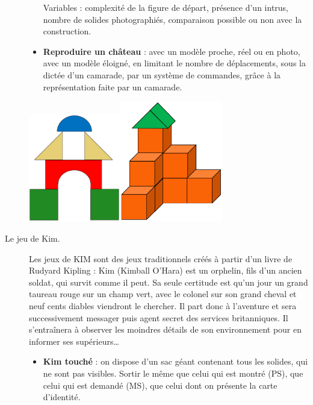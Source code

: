 \begin{exercice*}
\begin{description}
\begin{itemize}
         Variables : complexité de la figure de départ, présence d’un intrus, nombre de solides photographiés, comparaison possible ou non avec la construction.
         \item {\bf Reproduire un château} : avec un modèle proche, réel ou en photo, avec un modèle éloigné, en limitant le nombre de déplacements, sous la dictée d’un camarade, par un système de commandes, grâce à la représentation faite par un camarade.
      \end{itemize}
      \begin{center}
         \includegraphics[width=4cm]{Geometrie_did/Images/Geo6_activites_chateau1}\qquad \qquad \includegraphics[width=4.5cm]{Geometrie_did/Images/Geo6_activites_chateau2}
      \end{center}
   \item[Le jeu de Kim.]Les jeux de KIM sont des jeux traditionnels créés à partir d’un livre de Rudyard Kipling : Kim (Kimball O’Hara) est un orphelin, fils d’un ancien soldat, qui survit comme il peut. Sa seule certitude est qu’un jour \og un grand taureau rouge sur un champ vert, avec le colonel sur son grand cheval et neuf cents diables \fg{} viendront le chercher. Il part donc à l’aventure et sera successivement messager puis agent secret des services britanniques. Il s’entraînera à observer les moindres détails de son environnement pour en informer ses supérieurs\dots
      \begin{itemize}
         \item {\bf Kim touché} : on dispose d'un sac géant contenant tous les solides, qui ne sont pas visibles. Sortir le même que celui qui est montré (PS), que celui qui est demandé (MS), que celui dont on présente la carte d’identité.

\end{itemize}
\end{description}
\end{exercice*}
